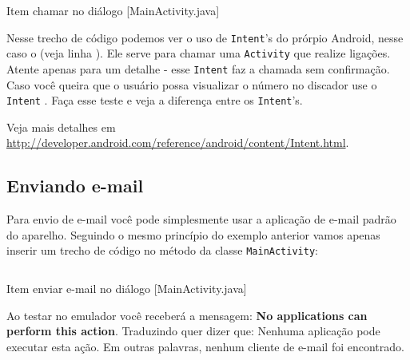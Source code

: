 \begin{listing}[H]
  \inputminted[linenos=true,frame=bottomline,tabsize=3]{ java }{ source/MainActivity-10.java }
  \caption{Item chamar no diálogo [MainActivity.java]}
\end{listing}

Nesse trecho de código podemos ver o uso de \texttt{Intent}'s do prórpio Android, nesse caso o
 (veja linha ). Ele serve para chamar uma \texttt{Activity} que realize ligações.
Atente apenas para um detalhe - esse \texttt{Intent} faz a chamada sem confirmação. Caso você
queira que o usuário possa visualizar o número no discador use o \texttt{Intent} .
Faça esse teste e veja a diferença entre os \texttt{Intent}'s.

Veja mais detalhes em \url{http://developer.android.com/reference/android/content/Intent.html}.

\newpage

\subsection{Enviando e-mail}

Para envio de e-mail você pode simplesmente usar a aplicação de e-mail padrão do aparelho.
Seguindo o mesmo princípio do exemplo anterior vamos apenas inserir um trecho de código
no método  da classe \texttt{MainActivity}:

\begin{listing}[H]
  \inputminted[linenos=true,frame=bottomline,tabsize=3]{ java }{ source/MainActivity-11.java }
  \caption{Item enviar e-mail no diálogo [MainActivity.java]}
\end{listing}

Ao testar no emulador você receberá a mensagem: \textbf{No applications can perform this action}. Traduzindo
quer dizer que: Nenhuma aplicação pode executar esta ação. Em outras palavras, nenhum cliente de e-mail
foi encontrado.
 
%  
% 
% 
% 


